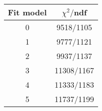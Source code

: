 \begin{tabular}{c|c}
Fit model & $\chi^2/$ndf \\
\hline
0 & 9518/1105\\
1 & 9777/1121\\
2 & 9937/1137\\
3 & 11308/1167\\
4 & 11333/1183\\
5 & 11737/1199\\
\end{tabular}
